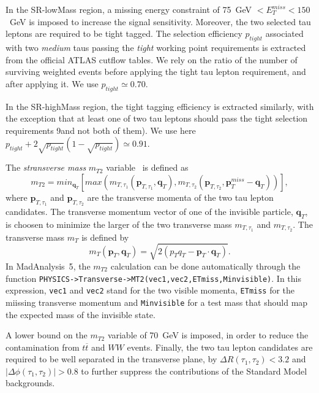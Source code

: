 \documentclass{ws-mpla}
\newcommand{\madanalysis}{{\sc MadAnalysis~5}}
\begin{document}
In the SR-lowMass region, a missing energy constraint of 75~GeV $< E^{miss}_T < 150$~GeV is imposed to increase the signal sensitivity. Moreover, the two selected tau leptons are required to be tight tagged.
The selection efficiency $p_{tight}$ associated with two {\it medium} taus passing the \textit{tight} working point requirements is extracted from the official ATLAS cutflow tables. We rely on the ratio of the number of surviving weighted events before applying the tight tau lepton requirement, and after applying it. We use $p_{tight}\simeq 0.70$.

In the SR-highMass region, the tight tagging efficiency is extracted similarly, with the exception that at least one of two tau leptons should pass the tight selection requirements 9and not both of them). We use here $p_{tight} + 2\sqrt{p_{tight}}(1-\sqrt{p_{tight}})\simeq 0.91$.

The \textit{stransverse mass} $m_{T2}$ variable~\cite{Lester:1999tx,Cheng:2008hk} is defined as
\begin{equation}
m_{T2} =min_{\mathbf{q}_T}
\left[
max(m_{T,\tau_1}(\mathbf{p}_{T,\tau_1},\mathbf{q}_T),m_{T,\tau_2}(\mathbf{p}_{T,\tau_2},\mathbf{p}^{miss}_T -\mathbf{q}_T))
\right],
\end{equation}   
where $\mathbf{p}_{T,\tau_1}$ and $\mathbf{p}_{T,\tau_2}$ are the transverse momenta of the two tau lepton candidates. The transverse momentum vector of one of the invisible particle, $\mathbf{q}_T$, is choosen to minimize the larger of the two transverse mass $m_{T,\tau_1}$ and $m_{T,\tau_2}$. The transverse mass $m_T$ is defined by
\begin{equation}
m_{T}(\mathbf{p}_T,\mathbf{q}_T) = \sqrt{2(p_T q_T -\mathbf{p}_T\cdot\mathbf{q}_T)}.
\end{equation} 
In \madanalysis, the $m_{T2}$ calculation can be done automatically through the function {\tt PHYSICS->Transverse->MT2(vec1,vec2,ETmiss,Minvisible)}. In this expression, {\tt vec1} and {\tt vec2} stand for the two visible momenta, {\tt ETmiss} for the miissing transverse momentum and {\tt Minvisible} for a test mass that should map the expected mass of the invisible state.

A lower bound on the $m_{T2}$ variable of 70~GeV is imposed, in order to reduce the contamination from $t\overline{t}$ and $WW$ events.
Finally, the two tau lepton candidates are required to be well separated in the transverse plane, by $\Delta R(\tau_1,\tau_2) < 3.2$ and $|\Delta\phi (\tau_1,\tau_2)| > 0.8$ to further suppress the contributions of the Standard Model backgrounds.
\end{document}
